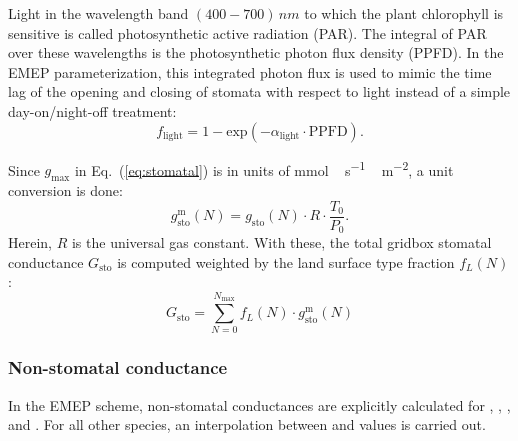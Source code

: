 \documentclass[gmd, manuscript]{copernicus}
\begin{document}
Light in the wavelength band $(400-700)\,\unit{nm}$ to which the plant chlorophyll is sensitive is called photosynthetic active radiation (PAR). The integral of PAR over these wavelengths is the photosynthetic photon flux density (PPFD). In the EMEP parameterization, this integrated photon flux is used to mimic the time lag of the opening and closing of stomata with respect to light instead of a simple day-on/night-off treatment:
\begin{equation}
  f_\text{light} = 1-\text{exp}(-\alpha_\text{light}\cdot \text{PPFD}).
  \label{eq:flight}
\end{equation}

Since $g_\text{max}$ in Eq.~(\ref{eq:stomatal}) is in units of \unit{mmol\,s^{-1}\,m^{-2}}, a unit conversion is done:
\begin{equation}
  g^\text{m}_{\text{sto}}(N) = g_{\text{sto}}(N) \cdot R \cdot \frac{T_0}{P_0}.
\end{equation}
Herein, $R$ is the universal gas constant. With these, the total gridbox stomatal conductance $G_\text{sto}$ is computed weighted by the land surface type fraction $f_L(N)$:
\begin{equation}
  G_\text{sto} = \sum_{N=0}^{N_\text{max}} f_L(N)\cdot g^\text{m}_{\text{sto}}(N)
\end{equation}

\subsubsection*{Non-stomatal conductance}
In the EMEP scheme, non-stomatal conductances are explicitly calculated for , , , and . For all other species, an interpolation between  and  values is carried out.
\end{document}
